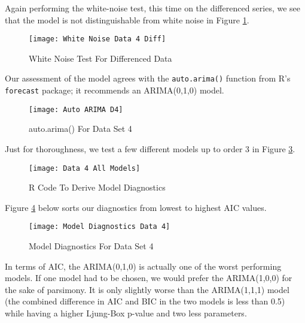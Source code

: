 \documentclass[12pt, letterpaper]{article}
\theoremstyle{definition}
\numberwithin{equation}{section}
\newcommand{\+}[1]{+_{\scalebox{.375}{#1}}}
\newcommand{\1}{\mathbbm{1}}
\begin{document}
Again performing the white-noise test, this time on the differenced series, we see that the model is not distinguishable from white noise in Figure \ref{White Noise Data 4 Diff}.

\begin{figure}[H]
	\centering
	\texttt{[image: White Noise Data 4 Diff]}
	\caption{White Noise Test For Differenced Data}
	\label{White Noise Data 4 Diff}
\end{figure}

Our assessment of the model agrees with the \texttt{auto.arima()} function from R's \texttt{forecast} package; it recommends an ARIMA(0,1,0) model.

\begin{figure}[H]
	\centering
	\texttt{[image: Auto ARIMA D4]}
	\caption{auto.arima() For Data Set 4}
	\label{Auto ARIMA D4}
\end{figure}






\newpage
\noindent\textbf{}
\vspace{\baselineskip}

Just for thoroughness, we test a few different models up to order 3 in Figure \ref{R Code To Derive Model Diagnostics}.

\begin{figure}[H]
	\centering
	\texttt{[image: Data 4 All Models]}
	\caption{R Code To Derive Model Diagnostics}
	\label{R Code To Derive Model Diagnostics}
\end{figure}

Figure \ref{Model Diagnostics For Dataset 4} below sorts our diagnostics from lowest to highest AIC values.

\begin{figure}[H]
	\centering
	\texttt{[image: Model Diagnostics Data 4]}
	\caption{Model Diagnostics For Data Set 4}
	\label{Model Diagnostics For Dataset 4}
\end{figure}

In terms of AIC, the ARIMA(0,1,0) is actually one of the worst performing models. If one model had to be chosen, we would prefer the ARIMA(1,0,0) for the sake of parsimony. It is only slightly worse than the ARIMA(1,1,1) model (the combined difference in AIC and BIC in the two models is less than 0.5) while having a higher Ljung-Box p-value and two less parameters.
\end{document}
